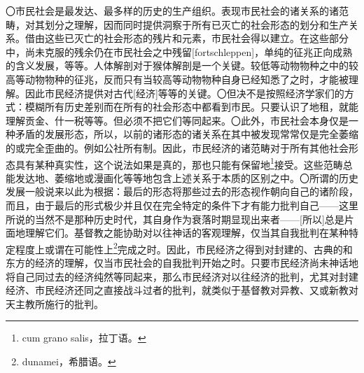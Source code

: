 \documentclass[a4paper,twoside,12pt]{ctexart}
\begin{document}
〇市民社会是最发达、最多样的历史的生产组织。表现市民社会的诸关系的诸范畴，对其划分之理解，因而同时提供洞察于所有已灭亡的社会形态的划分和生产关系。借由这些已灭亡的社会形态的残片和元素，市民社会得以建立。在这些部分中，尚未克服的残余仍在市民社会之中残留[fortschleppen]，单纯的征兆正向成熟的含义发展，等等。人体解剖对于猴体解剖是一个关键。较低等动物物种之中的较高等动物物种的征兆，反而只有当较高等动物物种自身已经知悉了之时，才能被理解。因此市民经济提供对古代[经济]等等的关键。〇但决不是按照经济学家们的方式：模糊所有历史差别而在所有的社会形态中都看到市民。只要认识了地租，就能理解贡金、什一税等等。但必须不把它们等同起来。〇此外，市民社会本身仅是一种矛盾的发展形态，所以，以前的诸形态的诸关系在其中被发现常常仅是完全萎缩的或完全歪曲的。例如公社所有制。因此，市民经济的诸范畴对于所有其他社会形态具有某种真实性，这个说法如果是真的，那也只能有保留地\footnote{cum grano salis，拉丁语。}接受。这些范畴总能发达地、萎缩地或漫画化等等地包含上述关系于本质的区别之中。〇所谓的历史发展一般说来以此为根据：最后的形态将那些过去的形态视作朝向自己的诸阶段，而且，由于最后的形式极少并且仅在完全特定的条件下才有能力批判自己——这里所说的当然不是那种历史时代，其自身作为衰落时期显现出来者——[所以]总是片面地理解它们。基督教之能协助对以往神话的客观理解，仅当其自我批判在某种特定程度上或谓在可能性上\footnote{dunamei，希腊语。}完成之时。因此，市民经济之得到对封建的、古典的和东方的经济的理解，仅当市民社会的自我批判开始之时。只要市民经济尚未神话地将自己同过去的经济纯然等同起来，那么市民经济对以往经济的批判，尤其对封建经济、市民经济还同之直接战斗过者的批判，就类似于基督教对异教、又或新教对天主教所施行的批判。
\end{document}
